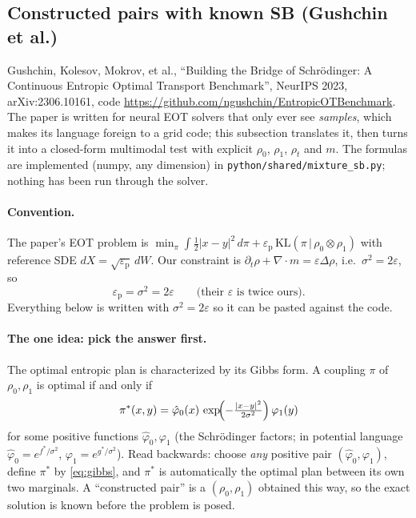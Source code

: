 \documentclass[11pt]{article}
\newcommand{\eps}{\varepsilon}
\newcommand{\code}[1]{\texttt{#1}}
\newcommand{\dv}{\nabla\cdot}
\begin{document}
\subsection{Constructed pairs with known SB (Gushchin et al.)}
\label{sec:gushchin}

Gushchin, Kolesov, Mokrov, et al., ``Building the Bridge of Schr\"odinger: A
Continuous Entropic Optimal Transport Benchmark'', NeurIPS 2023, arXiv:2306.10161,
code \url{https://github.com/ngushchin/EntropicOTBenchmark}. The paper is written
for neural EOT solvers that only ever see \emph{samples}, which makes its language
foreign to a grid code; this subsection translates it, then turns it into a
closed-form multimodal test with explicit $\rho_0$, $\rho_1$, $\rho_t$ and $m$.
The formulas are implemented (numpy, any dimension) in
\code{python/shared/mixture\_sb.py}; nothing has been run through the solver.

\paragraph{Convention.} The paper's EOT problem is
$\min_\pi \int \tfrac12|x-y|^2\,d\pi + \eps_{\mathrm p}\,\mathrm{KL}(\pi\,|\,\rho_0\otimes\rho_1)$
with reference SDE $dX=\sqrt{\eps_{\mathrm p}}\,dW$. Our constraint is
$\partial_t\rho+\dv m=\eps\Delta\rho$, i.e.\ $\sigma^2=2\eps$, so
\[
  \eps_{\mathrm p}=\sigma^2=2\eps \qquad\text{(their $\eps$ is twice ours).}
\]
Everything below is written with $\sigma^2=2\eps$ so it can be pasted against the code.

\paragraph{The one idea: pick the answer first.}
The optimal entropic plan is characterized by its Gibbs form. A coupling $\pi$ of
$\rho_0,\rho_1$ is optimal if and only if
\begin{equation}
  \pi^\ast(x,y)=\hat\varphi_0(x)\,
  \exp\!\Bigl(-\tfrac{|x-y|^2}{2\sigma^2}\Bigr)\,\varphi_1(y)
  \label{eq:gibbs}
\end{equation}
for some positive functions $\hat\varphi_0,\varphi_1$ (the Schr\"odinger factors;
in potential language $\hat\varphi_0=e^{f^\ast/\sigma^2}$, $\varphi_1=e^{g^\ast/\sigma^2}$).
Read backwards: choose \emph{any} positive pair $(\hat\varphi_0,\varphi_1)$, define
$\pi^\ast$ by \eqref{eq:gibbs}, and $\pi^\ast$ is automatically the optimal plan
between its own two marginals. A ``constructed pair'' is a $(\rho_0,\rho_1)$
obtained this way, so the exact solution is known before the problem is posed.
\end{document}
